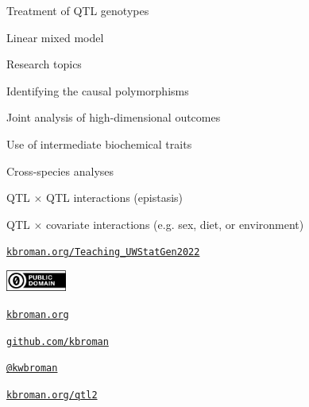 \documentclass[aspectratio=169,12pt,t]{beamer}
\begin{document}
\begin{frame}{Treatment of QTL genotypes}
\end{frame}





\begin{frame}{Linear mixed model}

\end{frame}



\begin{frame}{Research topics}

  \bbi
\item Identifying the causal polymorphisms
\item Joint analysis of high-dimensional outcomes
\item Use of intermediate biochemical traits
\item Cross-species analyses
\item QTL $\times$ QTL interactions {\lolit (epistasis)}
\item QTL $\times$ covariate interactions {\lolit (e.g. sex, diet, or environment)}
  \ei

\end{frame}



\begin{frame}[c]{}

\Large

\href{https://kbroman.org/Teaching_UWStatGen2022}{\tt kbroman.org/Teaching\_UWStatGen2022}

\vspace*{-7mm}
\hfill
\href{https://creativecommons.org/publicdomain/zero/1.0/}{\includegraphics[height=7mm]{Figs/cc-zero.png}}

\vspace{3mm}

\href{https://kbroman.org}{\tt \lolit kbroman.org}

\vspace{4mm}

\href{https://github.com/kbroman}{\tt \lolit github.com/kbroman}

\vspace{4mm}

\href{https://twitter.com/kwbroman}{\tt \lolit @kwbroman}

\vspace{4mm}

\href{https://kbroman.org/qtl2}{\tt \lolit kbroman.org/qtl2}





\end{frame}
\end{document}
